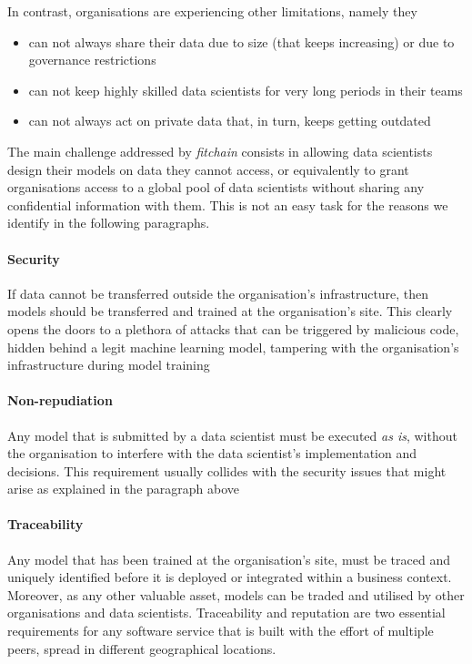 \documentclass[12pt, a4paper,titlepage]{extreport}
\begin{document}
In contrast, organisations are experiencing other limitations, namely they

\begin{itemize}
\item can not always share their data due to size (that keeps increasing) or due to governance restrictions
\item can not keep highly skilled data scientists for very long periods in their teams
\item can not always act on private data that, in turn, keeps getting outdated 
\end{itemize}

The main challenge addressed by \textit{fitchain} consists in allowing data scientists  design their models on data they cannot access, or equivalently to grant organisations access to a global pool of data scientists without sharing any confidential information with them. 
This is not an easy task for the reasons we identify in the following paragraphs. 


\paragraph{Security}
If data cannot be transferred outside the organisation's infrastructure, then models should be transferred and trained at the organisation's site. This clearly opens the doors to a plethora of attacks that can be triggered by malicious code, hidden behind a legit machine learning model, tampering with the organisation's infrastructure during model training

\paragraph{Non-repudiation}
Any model that is submitted by a data scientist must be executed \textit{as is}, without the organisation to interfere with the data scientist's implementation and decisions. This requirement usually collides with the security issues that might arise as explained in the paragraph above

\paragraph{Traceability}
Any model that has been trained at the organisation's site, must be traced and uniquely identified before it is deployed or integrated within a business context. Moreover, as any other valuable asset, models can be traded and utilised by other organisations and data scientists. Traceability and reputation are two essential requirements for any software service that is built with the effort of multiple peers, spread in different geographical locations.
\end{document}
